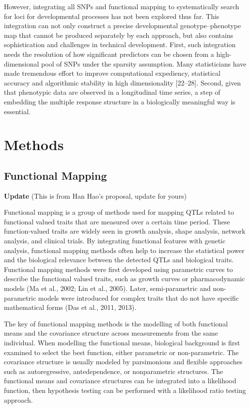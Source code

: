 \documentclass[11pt,]{book}
\theoremstyle{definition}
\theoremstyle{definition}
\theoremstyle{remark}
\begin{document}
However, integrating all SNPs and functional mapping to systematically
search for loci for developmental processes has not been explored thus
far. This integration can not only construct a precise developmental
genotype--phenotype map that cannot be produced separately by each
approach, but also contains sophistication and challenges in technical
development. First, such integration needs the resolution of how
significant predictors can be chosen from a high-dimensional pool of
SNPs under the sparsity assumption. Many statisticians have made
tremendous effort to improve computational expediency, statistical
accuracy and algorithmic stability in high dimensionality {[}22--28{]}.
Second, given that phenotypic data are observed in a longitudinal time
series, a step of embedding the multiple response structure in a
biologically meaningful way is essential.

\section{Methods}\label{methods-2}

\subsection{Functional Mapping}\label{functional-mapping}

\textbf{Update} (This is from Han Hao's proposal, update for yours)

Functional mapping is a group of methods used for mapping QTLs related
to functional valued traits that are measured over a certain time
period. These function-valued traits are widely seen in growth analysis,
shape analysis, network analysis, and clinical trials. By integrating
functional features with genetic analysis, functional mapping methods
often help to increase the statistical power and the biological
relevance between the detected QTLs and biological traits. Functional
mapping methods were first developed using parametric curves to describe
the functional valued traits, such as growth curves or pharmacodynamic
models (Ma et al., 2002; Lin et al., 2005). Later, semi-parametric and
non-parametric models were introduced for complex traits that do not
have specific mathematical forms (Das et al., 2011, 2013).

The key of functional mapping methods is the modelling of both
functional means and the covariance structure across measurements from
the same individual. When modelling the functional means, biological
background is first examined to select the best function, either
parametric or non-parametric. The covariance structure is usually
modeled by parsimonious and flexible approaches such as autoregressive,
antedependence, or nonparametric structures. The functional means and
covariance structures can be integrated into a likelihood function, then
hypothesis testing can be performed with a likelihood ratio testing
approach.
\end{document}
